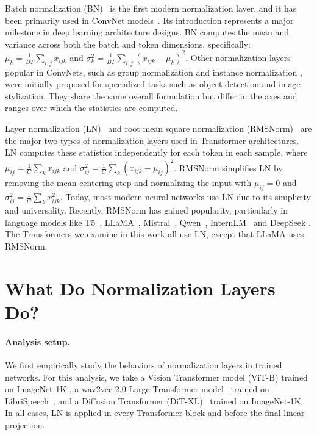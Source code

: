 Batch normalization (BN)~\citep{ioffe2015batch} is the first modern normalization layer, and it has been primarily used in ConvNet models~\citep{szegedy2016rethinking,he2016deep,xie2017aggregated}. Its introduction represents a major milestone in deep learning architecture designs. BN computes the mean and variance across both the batch and token dimensions, specifically: $\mu_k = \frac{1}{B T} \sum_{i,j} x_{i j k}$ and $\sigma^2_k = \frac{1}{B T} \sum_{i, j} \left( x_{i j k} - \mu_k \right)^2 $. Other normalization layers popular in ConvNets, such as group normalization \citep{wu2018group} and instance normalization \citep{ulyanov2016instance}, were initially proposed for specialized tasks such as object detection and image stylization. They share the same overall formulation but differ in the axes and ranges over which the statistics are computed.

Layer normalization (LN)~\citep{ba2016layer} and 
root mean square normalization (RMSNorm)~\citep{zhang2019root} are the major two types of normalization layers used in Transformer architectures.
LN computes these statistics independently for each token in each sample, where $\mu_{i j} = \frac{1}{C} \sum_{k} x_{i j k}$ and $\sigma^2_{i j} = \frac{1}{C} \sum_{k} \left( x_{i j k} - \mu_{ij} \right)^2 $.
RMSNorm \citep{zhang2019root} simplifies LN by removing the mean-centering step and normalizing the input with $\mu_{ij} = 0$ and $\sigma^2_{i j} = \frac{1}{C} \sum_{k} x^2_{i j k}$. 
Today, most modern neural networks use LN due to its simplicity and universality. Recently, RMSNorm has gained popularity, particularly in language models like T5~\citep{raffel2020exploring}, LLaMA~\citep{touvron2023llama,touvron2023llama2, dubey2024llama}, Mistral~\citep{jiang2023mistral}, Qwen~\citep{bai2023qwen, yang2024qwen2}, InternLM~\citep{zhang2024internlm, cai2024internlm2} and DeepSeek \citep{liu2024deepseek, guo2025deepseek}. The Transformers we examine in this work all use LN, except that LLaMA uses RMSNorm.

\section{What Do Normalization Layers Do?}

\paragraph{Analysis setup.}
We first empirically study the behaviors of normalization layers in trained networks. For this analysis, we take a Vision Transformer model (ViT-B) \citep{dosovitskiy2020image} trained on ImageNet-1K \citep{deng2009imagenet}, a wav2vec 2.0 Large Transformer model~\citep{baevski2020wav2vec} trained on LibriSpeech~\citep{panayotov2015librispeech}, and a Diffusion Transformer (DiT-XL)~\citep{peebles2023scalable} trained on ImageNet-1K. In all cases, LN is applied in every Transformer block and before the final linear projection.

